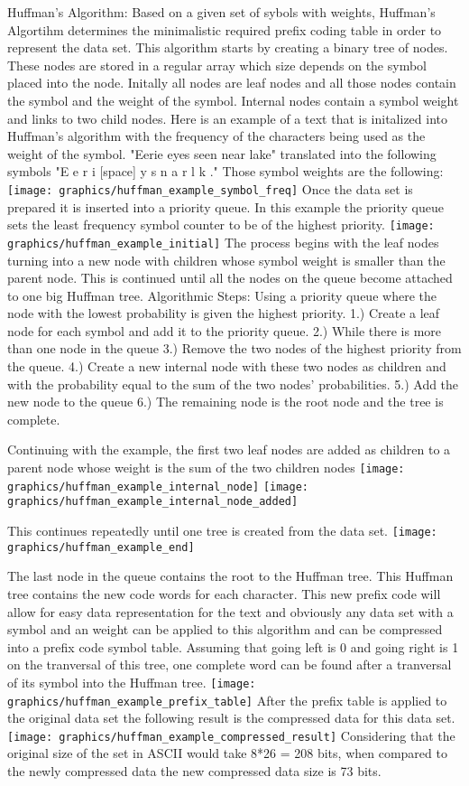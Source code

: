\documentclass[letterpaper, 12pt]{article}
\begin{document}
	Huffman's Algorithm:
	Based on a given set of sybols with weights, Huffman's Algortihm determines the minimalistic required prefix coding
	table in order to represent the data set. This algorithm starts by creating a binary tree of nodes. These nodes 
	are stored in a regular array which size depends on the symbol placed into the node. Initally all nodes are leaf
	nodes and all those nodes contain the symbol and the weight of the symbol. Internal nodes contain a symbol weight
	and links to two child nodes. Here is an example of a text that is initalized into Huffman's algorithm with the 
	frequency of the characters being used as the weight of the symbol.
	"Eerie eyes seen near lake" translated into the following symbols "E e r i [space] y s n a r l k ."
	Those symbol weights are the following:
	\texttt{[image: graphics/huffman\_example\_symbol\_freq]}
	Once the data set is prepared it is inserted into a priority queue. In this example the priority queue sets the least
	frequency symbol counter to be of the highest priority.
	\texttt{[image: graphics/huffman\_example\_initial]}
	The process begins with the leaf nodes turning into a new node with children whose symbol weight is smaller than 
	the parent node. This is continued until all the nodes on the queue become attached to one big Huffman tree.
	Algorithmic Steps:
	Using a priority queue where the node with the lowest probability is given the highest priority. 
	1.) Create a leaf node for each symbol and add it to the priority queue. 
	2.) While there is more than one node in the queue 
		3.) Remove the two nodes of the highest priority from the queue.
		4.) Create a new internal node with these two nodes as children and with the probability equal to
		the sum of the two nodes' probabilities. 
		5.) Add the new node to the queue
	6.) The remaining node is the root node and the tree is complete.
	
	Continuing with the example, the first two leaf nodes are added as children to a parent node whose
	weight is the sum of the two children nodes
	\texttt{[image: graphics/huffman\_example\_internal\_node]}
	\texttt{[image: graphics/huffman\_example\_internal\_node\_added]}
	
	This continues repeatedly until one tree is created from the data set. 
	\texttt{[image: graphics/huffman\_example\_end]}
	
	The last node in the queue contains the root to the Huffman tree. This Huffman tree
	contains the new code words for each character. This new prefix code will allow for easy 
	data representation for the text and obviously any data set with a symbol and an weight can 
	be applied to this algorithm and can be compressed into a prefix code symbol table. 
	Assuming that going left is 0 and going right is 1 on the tranversal of this tree, one complete 
	word can be found after a tranversal of its symbol into the Huffman tree.
	\texttt{[image: graphics/huffman\_example\_prefix\_table]}
	After the prefix table is applied to the original data set the following result is the compressed
	data for this data set.
	\texttt{[image: graphics/huffman\_example\_compressed\_result]}
	Considering that the original size of the set in ASCII would take 8*26 = 208 bits, when compared to
	the newly compressed data the new compressed data size is 73 bits. 
\end{document}

